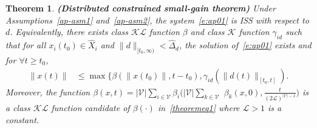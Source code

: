 \documentclass[journal]{IEEEtran}
\newcommand{\KK}{{\mathcal{K}}}
\newcommand{\LL}{{\mathcal{L}}}
\newcommand{\VV}{{\mathcal{V}}}
\newtheorem{theorem}{\bf Theorem}[section]
\begin{document}
\begin{theorem}\textbf{(Distributed constrained small-gain theorem)}
Under Assumptions~\ref{ap-asm1} and~\ref{ap-asm2}, the system~\eqref{e:ap01} is ISS with respect to $d$. Equivalently, there exists class $\mathcal{KL}$ function $\beta$ and class $\mathcal{K}$ function $\gamma_{id}$ such that for all $x_i(t_0) \in \hat{X}_i$ and $\|d\|_{[t_0,\infty)}<\hat{\Delta}_d$, the solution of~\eqref{e:ap01} exists and for $\forall t \geq t_0$,
\begin{align}
\|x(t)\| &\leq \max\{\beta(\|x(t_0)\|, t-t_0), \gamma_{id}(\|d(t)\|_{[t_0,t]}).
\label{theoremeq1}
\end{align}
Moreover, the function
$\beta(x,t) = |{\VV}|\sum_{i \in {\VV}}\beta_i(|{\VV}|\sum_{k \in {\VV}}$ $\beta_k(x,0),\frac{t}{(2\LL)^{|{\VV}|-1}})$
is a class $\KK\LL$ function candidate of $\beta(\cdot)$ in~\eqref{theoremeq1} where $\LL >1$ is a constant.
\label{ap-the3}
\end{theorem}
\end{document}
